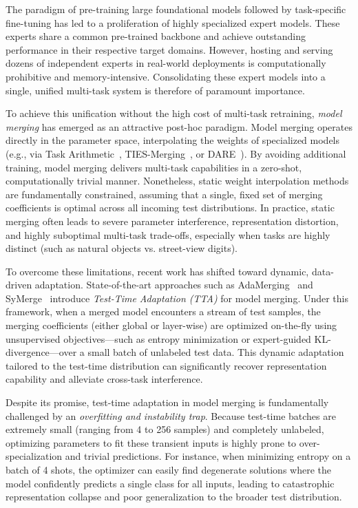 \documentclass{article}
\theoremstyle{plain}
\theoremstyle{definition}
\theoremstyle{remark}
\begin{document}
The paradigm of pre-training large foundational models followed by task-specific fine-tuning has led to a proliferation of highly specialized expert models. These experts share a common pre-trained backbone and achieve outstanding performance in their respective target domains. However, hosting and serving dozens of independent experts in real-world deployments is computationally prohibitive and memory-intensive. Consolidating these expert models into a single, unified multi-task system is therefore of paramount importance.

To achieve this unification without the high cost of multi-task retraining, \emph{model merging} has emerged as an attractive post-hoc paradigm. Model merging operates directly in the parameter space, interpolating the weights of specialized models (e.g., via Task Arithmetic~\cite{ilharco2022editing}, TIES-Merging~\cite{yadav2023ties}, or DARE~\cite{yu2023language}). By avoiding additional training, model merging delivers multi-task capabilities in a zero-shot, computationally trivial manner. Nonetheless, static weight interpolation methods are fundamentally constrained, assuming that a single, fixed set of merging coefficients is optimal across all incoming test distributions. In practice, static merging often leads to severe parameter interference, representation distortion, and highly suboptimal multi-task trade-offs, especially when tasks are highly distinct (such as natural objects vs. street-view digits).

To overcome these limitations, recent work has shifted toward dynamic, data-driven adaptation. State-of-the-art approaches such as AdaMerging~\cite{yang2023adamerging} and SyMerge~\cite{jung2024symerge} introduce \emph{Test-Time Adaptation (TTA)} for model merging. Under this framework, when a merged model encounters a stream of test samples, the merging coefficients (either global or layer-wise) are optimized on-the-fly using unsupervised objectives—such as entropy minimization or expert-guided KL-divergence—over a small batch of unlabeled test data. This dynamic adaptation tailored to the test-time distribution can significantly recover representation capability and alleviate cross-task interference.

Despite its promise, test-time adaptation in model merging is fundamentally challenged by an \emph{overfitting and instability trap}. Because test-time batches are extremely small (ranging from 4 to 256 samples) and completely unlabeled, optimizing parameters to fit these transient inputs is highly prone to over-specialization and trivial predictions. For instance, when minimizing entropy on a batch of 4 shots, the optimizer can easily find degenerate solutions where the model confidently predicts a single class for all inputs, leading to catastrophic representation collapse and poor generalization to the broader test distribution.
\end{document}
